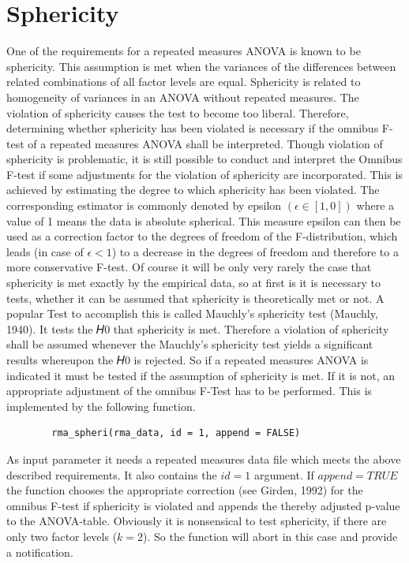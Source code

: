 \documentclass[11pt]{article}
\begin{document}
	\section{Sphericity}
		One of the requirements for a repeated measures ANOVA is known to be sphericity. This assumption is met when the variances of the differences between related combinations of all factor levels are equal. Sphericity is related to homogeneity of variances in an ANOVA without repeated measures. The violation of sphericity causes the test to become too liberal. Therefore, determining whether sphericity has been violated is necessary if the omnibus F-test of a repeated measures ANOVA shall be interpreted. Though violation of sphericity is problematic, it is still possible to conduct and interpret the Omnibus F-test if some adjustments for the violation of sphericity are incorporated. This is achieved by estimating the degree to which sphericity has been violated. The corresponding estimator is commonly denoted by epsilon $(\epsilon \in[1,0])$ where a value of 1 means the data is absolute spherical. This measure epsilon can then be used as a correction factor to the degrees of freedom of the F-distribution, which leads (in case of $\epsilon<1$) to a decrease in the degrees of freedom and therefore to a more conservative F-test. Of course it will be only very rarely the case that sphericity is met exactly by the empirical data, so at first is it is necessary to tests, whether it can be assumed that sphericity is theoretically met or not. A popular Test to accomplish this is called Mauchly's sphericity test (Mauchly, 1940). It tests the 𝐻0 that sphericity is met. Therefore a violation of sphericity shall be assumed whenever the Mauchly's sphericity test yields a significant results whereupon the 𝐻0 is rejected. So if a repeated measures ANOVA is indicated it must be tested if the assumption of sphericity is met. If it is not, an appropriate adjustment of the omnibus F-Test has to be performed. This is implemented by the following function.\\
		
		\begin{lstlisting}
		rma_spheri(rma_data, id = 1, append = FALSE)
		\end{lstlisting}
		
		As input parameter it needs a repeated measures data file which meets the above described requirements. It also contains the $id = 1$ argument. If $append = TRUE$ the function chooses the appropriate correction (see Girden, 1992) for the omnibus F-test if sphericity is violated and appends the thereby adjusted p-value to the ANOVA-table. Obviously it is nonsensical to test sphericity, if there are only two factor levels ($k = 2$). So the function will abort in this case and provide a notification.\\
		
\end{document}
